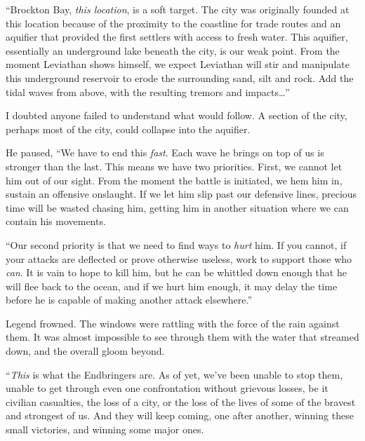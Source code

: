 ``Brockton Bay, \emph{this location}, is a soft target.  The city was originally founded at this location because of the proximity to the coastline for trade routes and an aquifier that provided the first settlers with access to fresh water.  This aquifier, essentially an underground lake beneath the city, is our weak point.  From the moment Leviathan shows himself, we expect Leviathan will stir and manipulate this underground reservoir to erode the surrounding sand, silt and rock.  Add the tidal waves from above, with the resulting tremors and impacts\ldots''



I doubted anyone failed to understand what would follow.  A section of the city, perhaps most of the city, could collapse into the aquifier.



He paused, ``We have to end this \emph{fast}.  Each wave he brings on top of us is stronger than the last.  This means we have two priorities.  First, we cannot let him out of our sight.  From the moment the battle is initiated, we hem him in, sustain an offensive onslaught.  If we let him slip past our defensive lines, precious time will be wasted chasing him, getting him in another situation where we can contain his movements.



``Our second priority is that we need to find ways to \emph{hurt} him.  If you cannot, if your attacks are deflected or prove otherwise useless, work to support those who \emph{can}.  It is vain to hope to kill him, but he can be whittled down enough that he will flee back to the ocean, and if we hurt him enough, it may delay the time before he is capable of making another attack elsewhere.''



Legend frowned.  The windows were rattling with the force of the rain against them.  It was almost impossible to see through them with the water that streamed down, and the overall gloom beyond.



``\emph{This} is what the Endbringers are.  As of yet, we've been unable to stop them, unable to get through even one confrontation without grievous losses, be it civilian casualties, the loss of a city, or the loss of the lives of some of the bravest and strongest of us.  And they will keep coming, one after another, winning these small victories, and winning some major ones.



